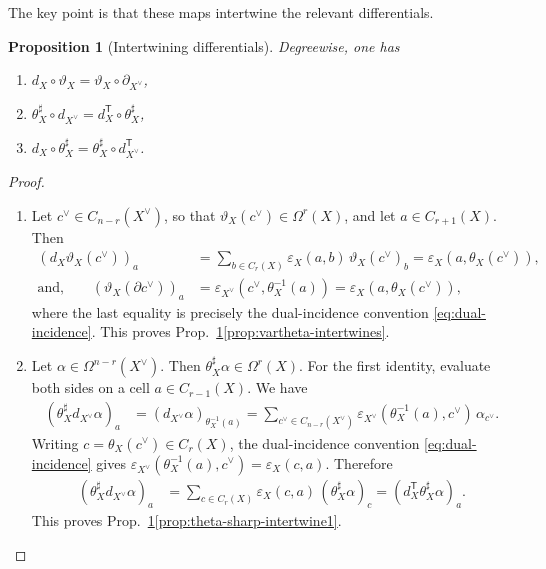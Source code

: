 \documentclass[dvipsnames,a4paper]{article}
\numberwithin{equation}{section}
\newtheorem{prop}[theorem]{Proposition}
\theoremstyle{definition}
\theoremstyle{remark}
\begin{document}
The key point is that these maps intertwine the relevant differentials.
\begin{prop}[Intertwining differentials]\label{prop:intertwine}
	Degreewise, one has
	\begin{enumerate}[label=(\roman*)]
		\item \label{prop:vartheta-intertwines} $d_X\circ \vartheta_X = \vartheta_X\circ \partial_{X^\vee}$,
		\item \label{prop:theta-sharp-intertwine1} $\theta_X^\sharp\circ d_{X^\vee}
		=
		d_X^{\mathsf T}\circ \theta_X^\sharp$,
		\item \label{prop:theta-sharp-intertwine2} $d_X\circ \theta_X^\sharp
		=
		\theta_X^\sharp\circ d_{X^\vee}^{\mathsf T}$.
	\end{enumerate}
\end{prop}
\begin{proof}
	\begin{enumerate}
		\item Let
		\(c^\vee\in C_{n-r}(X^\vee)\), so that
		\(\vartheta_X(c^\vee)\in \Omega^r(X)\), and let \(a\in C_{r+1}(X)\). Then
		\begin{align*}
			\left(d_X\vartheta_X(c^\vee)\right)_a
			&=
			\sum_{b\in C_r(X)}
			\varepsilon_X(a,b)\,\vartheta_X(c^\vee)_b
			=
			\varepsilon_X\left(a,\theta_X(c^\vee)\right),
			\\
			\text{and,} \qquad \left(\vartheta_X(\partial c^\vee)\right)_a
			&=
			\varepsilon_{X^\vee}\left(c^\vee,\theta_X^{-1}(a)\right)
			=
			\varepsilon_X\left(a,\theta_X(c^\vee)\right),
		\end{align*}
		where the last equality is precisely the dual-incidence convention
		\eqref{eq:dual-incidence}. This proves Prop.~\ref{prop:intertwine}\ref{prop:vartheta-intertwines}.
		
		\item Let \(\alpha\in \Omega^{n-r}(X^\vee)\). Then $\theta_X^\sharp\alpha\in \Omega^r(X)$.
		For the first identity, evaluate both sides on a cell \(a\in C_{r-1}(X)\). We have
		\begin{align*}
			\left(\theta_X^\sharp d_{X^\vee}\alpha\right)_a
			&=
			\left(d_{X^\vee}\alpha\right)_{\theta_X^{-1}(a)}
			=
			\sum_{c^\vee\in C_{n-r}(X^\vee)}
			\varepsilon_{X^\vee}\left(\theta_X^{-1}(a),c^\vee\right)\,
			\alpha_{c^\vee}.
		\end{align*}
		Writing \(c=\theta_X(c^\vee)\in C_r(X)\), the dual-incidence convention \eqref{eq:dual-incidence} gives
		$
			\varepsilon_{X^\vee}\left(\theta_X^{-1}(a),c^\vee\right)
			=
			\varepsilon_X(c,a)
		$.
		Therefore
		\begin{align}
			\left(\theta_X^\sharp d_{X^\vee}\alpha\right)_a
			&=
			\sum_{c\in C_r(X)}
			\varepsilon_X(c,a)\,
			(\theta_X^\sharp\alpha)_c
			=
			\left(d_X^{\mathsf T}\theta_X^\sharp\alpha\right)_a.
		\end{align}
		This proves Prop.~\ref{prop:intertwine}\ref{prop:theta-sharp-intertwine1}.
		

\end{enumerate}
\end{proof}
\end{document}

